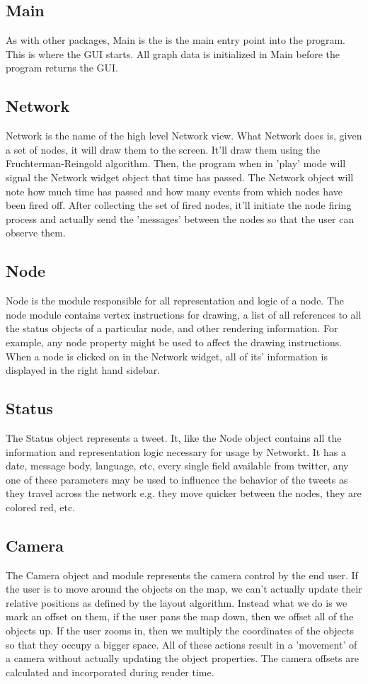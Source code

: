 \subsection{Main}
As with other packages, Main is the is the main entry point into the program. This is where the GUI starts. All graph data is initialized in Main before the program returns the GUI.

\subsection{Network}
Network is the name of the high level Network view. What Network does is, given a set of nodes, it will draw them to the screen. It'll draw them using the Fruchterman-Reingold algorithm. Then, the program when in 'play' mode will signal the Network widget object that time has passed. The Network object will note how much time has passed and how many events from which nodes have been fired off. After collecting the set of fired nodes, it'll initiate the node firing process and actually send the 'messages' between the nodes so that the user can observe them.

\subsection{Node}
Node is the module responsible for all representation and logic of a node. The node module contains vertex instructions for drawing, a list of all references to all the status objects of a particular node, and other rendering information. For example, any node property might be used to affect the drawing instructions. When a node is clicked on in the Network widget, all of its' information is displayed in the right hand sidebar.

\subsection{Status}
The Status object represents a tweet. It, like the Node object contains all the information and representation logic necessary for usage by Networkt. It has a date, message body, language, etc, every single field available from twitter, any one of these parameters may be used to influence the behavior of the tweets as they travel across the network e.g. they move quicker between the nodes, they are colored red, etc.

\subsection{Camera}
The Camera object and module represents the camera control by the end user. If the user is to move around the objects on the map, we can't actually update their relative positions as defined by the layout algorithm. Instead what we do is we mark an offset on them, if the user pans the map down, then we offset all of the objects up. If the user zooms in, then we multiply the coordinates of the objects so that they occupy a bigger space. All of these actions result in a 'movement' of a camera without actually updating the object properties. The camera offsets are calculated and incorporated during render time.

